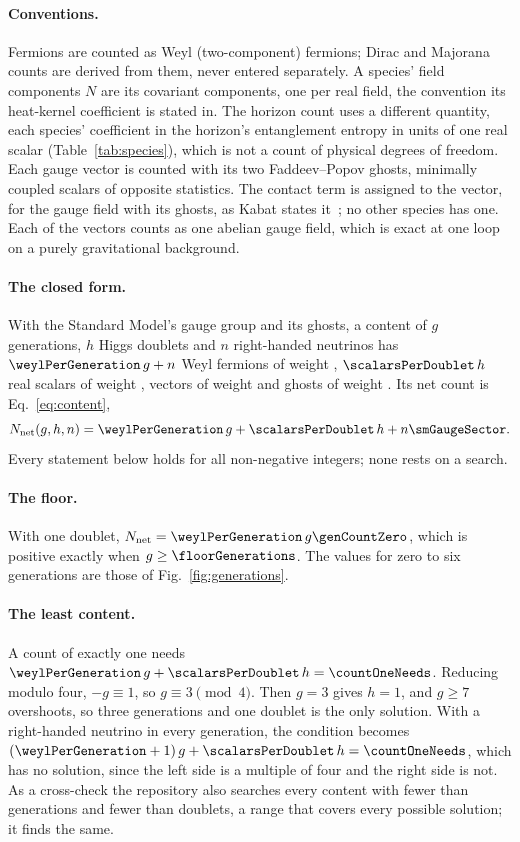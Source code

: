 \documentclass[aps,prd,reprint,amsmath,amssymb,superscriptaddress,nofootinbib]{revtex4-2}
\newcommand{\Nnet}{N_{\mathrm{net}}}
\begin{document}
\paragraph{Conventions.}
Fermions are counted as Weyl (two-component) fermions; Dirac and Majorana counts are
derived from them, never entered separately. A species' field components $N$ are its
covariant components, one per real field, the convention its heat-kernel coefficient is
stated in. The horizon count uses a different quantity, each species' coefficient in the
horizon's entanglement entropy in units of one real scalar (Table~\ref{tab:species}),
which is not a count of physical degrees of freedom. Each gauge vector is counted with
its two Faddeev--Popov ghosts, minimally coupled scalars of opposite statistics. The
contact term is assigned to the vector, for the gauge field with its ghosts, as Kabat
states it~\cite{Kabat1995}; no other species has one. Each of the \gaugeVectors{} vectors
counts as one abelian gauge field, which is exact at one loop on a purely gravitational
background.

\paragraph{The closed form.}
With the Standard Model's gauge group and its ghosts, a content of $g$ generations, $h$
Higgs doublets and $n$ right-handed neutrinos has $\weylPerGeneration\,g+n$ Weyl fermions
of weight \weightWeyl, $\scalarsPerDoublet\,h$ real scalars of weight \weightScalar,
\gaugeVectors{} vectors of weight \weightVector{} and \smGhosts{} ghosts of weight
\weightGhost. Its net count is Eq.~\eqref{eq:content},
\begin{equation}
  \Nnet(g,h,n)=\weylPerGeneration\,g+\scalarsPerDoublet\,h+n\smGaugeSector .
\end{equation}
Every statement below holds for all non-negative integers; none rests on a search.

\paragraph{The floor.}
With one doublet, $\Nnet=\weylPerGeneration\,g\genCountZero$, which is positive exactly
when $g\ge\floorGenerations$. The values for zero to six generations are those of
Fig.~\ref{fig:generations}.

\paragraph{The least content.}
A count of exactly one needs $\weylPerGeneration\,g+\scalarsPerDoublet\,h=\countOneNeeds$.
Reducing modulo four, $-g\equiv1$, so $g\equiv3\pmod 4$. Then $g=3$ gives $h=1$, and
$g\ge7$ overshoots, so three generations and one doublet is the only solution. With a
right-handed neutrino in every generation, the condition becomes
$(\weylPerGeneration+1)\,g+\scalarsPerDoublet\,h=\countOneNeeds$, which has no solution,
since the left side is a multiple of four and the right side is not. As a cross-check the
repository also searches every content with fewer than \searchedGenerations{} generations
and fewer than \searchedDoublets{} doublets, a range that covers every possible solution;
it finds the same.
\end{document}
